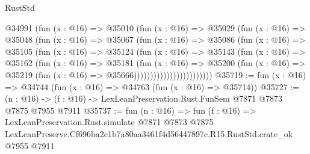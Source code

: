 \begin{lexlean}{RustStd}
\begin{coremodule}
                        @34991
                          (fun (x : @16) =>
                          @35010
                            (fun (x : @16) =>
                            @35029
                              (fun (x : @16) =>
                              @35048
                                (fun (x : @16) =>
                                @35067
                                  (fun (x : @16) =>
                                  @35086
                                    (fun (x : @16) =>
                                    @35105
                                      (fun (x : @16) =>
                                      @35124
                                        (fun (x : @16) =>
                                        @35143
                                          (fun (x : @16) =>
                                          @35162
                                            (fun (x : @16) =>
                                            @35181
                                              (fun (x : @16) =>
                                              @35200
                                                (fun (x : @16) =>
                                                @35219
                                                  (fun (x : @16) => @35666))))))))))))))))))))))))
@35719 := fun (x : @16) => @34744 (fun (x : @16) => @34763 (fun (x : @16) => @35714))
@35727 := (n : @16) -> (f : @16) -> LexLeanPreservation.Rust.FunSem @7871 @7873 @7875 @7955 @7911
@35737 := fun (n : @16) =>
  fun (f : @16) =>
  LexLeanPreservation.Rust.simulate
    @7871
    @7873
    @7875
    LexLeanPreserve.Cf696ba2c1b7a80aa3461f4d56447897c.R15.RustStd.crate_ok
    @7955
    @7911
\end{coremodule}
\end{lexlean}
